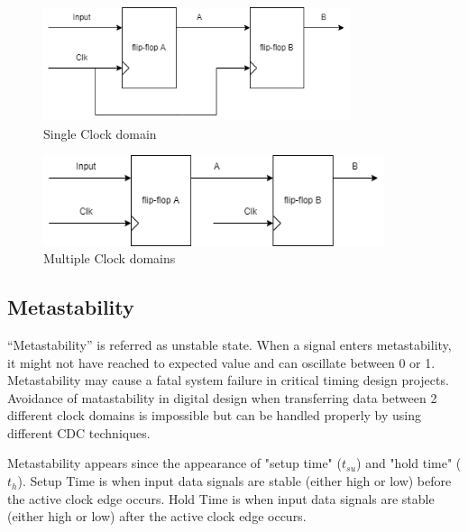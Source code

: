 \documentclass[a4paper, 12pt]{report}
\begin{document}
\begin{center}
    \begin{figure}[H]
        \begin{center}
            \includegraphics[width=9cm]{picture/CDC/hinh 1.png}
        \end{center}
        \caption{Single Clock domain}
        \label{ref Figure}
    \end{figure}
    
    \begin{figure}[H]
        \begin{center}
            \includegraphics[width=10cm]{picture/CDC/hinh 2.png}
        \end{center}
        \caption{Multiple Clock domains}
        \label{ref Figure}
    \end{figure}
\end{center}

\subsection{Metastability}  \cite{anysilicon}
“Metastability” is referred as unstable state. When a signal enters metastability, it might not have reached to expected value and can oscillate between 0 or 1. Metastability may cause a fatal system failure in critical timing design projects. Avoidance of matastability in digital design when transferring data between 2 different clock domains is impossible but can be handled properly by using different CDC techniques.

Metastability appears since the appearance of "setup time" ($t_{su}$) and "hold time" ($t_{h}$). Setup Time is when input data signals are stable (either high or low) before the active clock edge occurs. Hold Time is when input data signals are stable (either high or low) after the active clock edge occurs.
\end{document}
